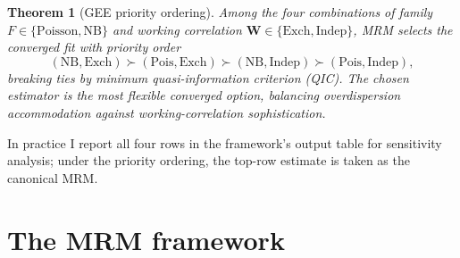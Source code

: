 \documentclass[11pt,a4paper]{article}
\theoremstyle{plain}
\newtheorem{theorem}{Theorem}[section]
\theoremstyle{definition}
\theoremstyle{remark}
\begin{document}
\begin{theorem}[GEE priority ordering]
\label{thm:gee-priority}
Among the four combinations of family
$F \in \{\text{Poisson}, \text{NB}\}$ and working correlation
$\mathbf{W} \in \{\text{Exch}, \text{Indep}\}$, MRM selects the
converged fit with priority order
\begin{equation*}
  (\text{NB}, \text{Exch}) \succ (\text{Pois}, \text{Exch})
   \succ (\text{NB}, \text{Indep}) \succ (\text{Pois}, \text{Indep}),
\end{equation*}
breaking ties by minimum quasi-information criterion (QIC).
The chosen estimator is the most flexible converged option,
balancing overdispersion accommodation against working-correlation
sophistication.
\end{theorem}

In practice I report all four rows in the framework's output
table for sensitivity analysis; under the priority ordering, the
top-row estimate is taken as the canonical MRM.

\section{The MRM framework}
\label{sec:mrm}
\end{document}
